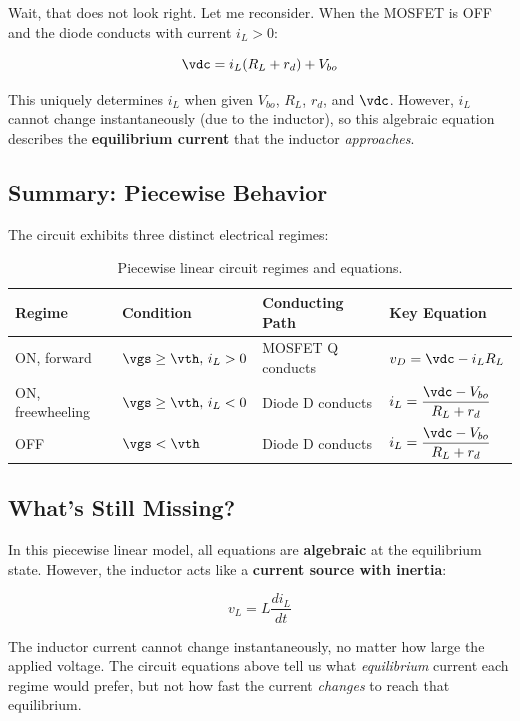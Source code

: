 Wait, that does not look right. Let me reconsider. When the MOSFET is OFF and the diode conducts with current $i_L > 0$:

\[
    \vdc = i_L(R_L + r_d) + V_{bo}
\]

This uniquely determines $i_L$ when given $V_{bo}$, $R_L$, $r_d$, and $\vdc$. However, $i_L$ cannot change instantaneously (due to the inductor), so this algebraic equation describes the \textbf{equilibrium current} that the inductor \textit{approaches}.

\subsection{Summary: Piecewise Behavior}

The circuit exhibits three distinct electrical regimes:

\begin{table}[h]
\centering
\small
\begin{tabular}{llll}
\toprule
\textbf{Regime} & \textbf{Condition} & \textbf{Conducting Path} & \textbf{Key Equation} \\
\midrule
ON, forward & $\vgs \geq \vth, \, i_L > 0$ & MOSFET Q conducts & $v_D = \vdc - i_L R_L$ \\
ON, freewheeling & $\vgs \geq \vth, \, i_L < 0$ & Diode D conducts & $i_L = \dfrac{\vdc - V_{bo}}{R_L + r_d}$ \\
OFF & $\vgs < \vth$ & Diode D conducts & $i_L = \dfrac{\vdc - V_{bo}}{R_L + r_d}$ \\
\bottomrule
\end{tabular}
\caption{Piecewise linear circuit regimes and equations.}
\label{tab:pwl_regimes}
\end{table}

\subsection{What's Still Missing?}

In this piecewise linear model, all equations are \textbf{algebraic} at the equilibrium state. However, the inductor acts like a \textbf{current source with inertia}:

\[
    v_L = L \frac{di_L}{dt}
\]

The inductor current cannot change instantaneously, no matter how large the applied voltage. The circuit equations above tell us what \textit{equilibrium} current each regime would prefer, but not how fast the current \textit{changes} to reach that equilibrium.

